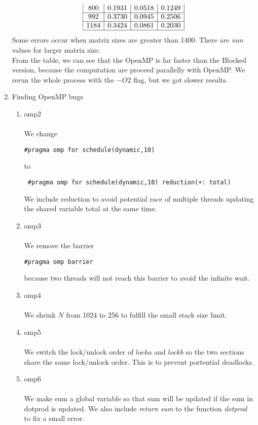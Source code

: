 \documentclass{article}
\begin{document}
\begin{enumerate}
\[\begin{array}{|c|c|c|c|c|}
800 & 0.1931 & 0.0518&0.1249\\ \hline
992 & 0.3730 & 0.0945 &0.2506\\ \hline
1184 & 0.3424 & 0.0861&0.2030\\ \hline
\end{array}
\]
Some errors occur when matrix sizes are greater than 1400. There are \emph{nan} values
for larger matrix size.
\\
From the table, we can see that the OpenMP is far faster than the Blocked version, because the computation are proceed parallelly with OpenMP. We rerun the whole process with the $-O2$ flag, but we got slower results.
\newpage
\item Finding OpenMP bugs
\begin{enumerate}
\item omp2
\\ \\
We change \begin{verbatim}#pragma omp for schedule(dynamic,10) \end{verbatim} to \begin{verbatim} #pragma omp for schedule(dynamic,10) reduction(+: total) \end{verbatim}
We include reduction to avoid potential race of multiple threads updating the shared variable total at the same time. 
\item omp3
\\ \\
We remove the barrier \begin{verbatim}#pragma omp barrier \end{verbatim}
because two threads will not reach this barrier to avoid the infinite wait.
\item omp4
\\ \\
We shrink $N$ from 1024 to 256 to fulfill the small stack size limit.
\item omp5
\\ \\
We switch the lock/unlock order of $locka$ and $lockb$ so the two sections share the same lock/unlock order.
This is to prevent portential deadlocks.
\item omp6
\\ \\
We make sum a global variable so that sum will be updated if the sum in dotprod is updated. We also include 
\emph{return sum} to the function \emph{dotprod} to fix a small error.
\end{enumerate}

\end{enumerate}
\end{document}
